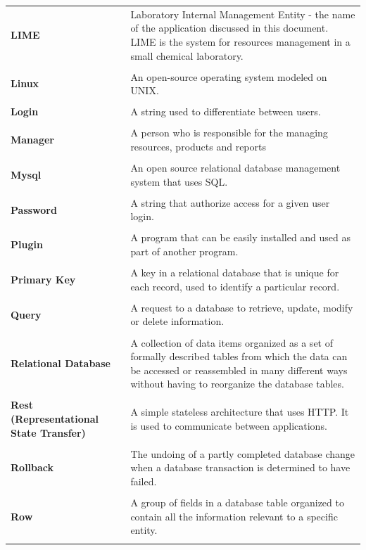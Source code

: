 \documentclass[a4paper,11pt,twoside]{report}
\theoremstyle{definition}
\begin{document}
\begin{longtable}{p{4cm} p{11cm}}
\textbf{LIME} & Laboratory Internal Management Entity - the name of the application discussed in this document. LIME is the system for resources management in a small chemical laboratory. \\ \\

\textbf{Linux} & An open-source operating system modeled on UNIX.\\ \\
\textbf{Login} & A string used to differentiate between users.\\ \\
\textbf{Manager} & A person who is responsible for the managing resources, products and reports\\ \\
\textbf{Mysql} & An open source relational database management system that uses SQL.\\ \\
\textbf{Password} & A string that authorize access for a given user login.\\ \\
\textbf{Plugin} & A program that can be easily installed and used as part of another program.\\ \\
\textbf{Primary Key} & A key in a relational database that is unique for each record, used to identify a particular record.\\ \\
\textbf{Query} & A request to a database to retrieve, update, modify or delete information.\\ \\
\textbf{Relational Database} & A collection of data items organized as a set of formally described tables from which the data can be accessed or reassembled in many different ways without having to reorganize the database tables.\\ \\
\textbf{Rest (\mbox{Representational} \mbox{State} \mbox{Transfer})} & A simple stateless architecture that uses HTTP. It is used to communicate between applications.\\ \\
\textbf{Rollback} & The undoing of a partly completed database change when a database transaction is determined to have failed.\\ \\
\textbf{Row} & A group of fields in a database table organized to contain all the information relevant to a specific entity.\\ \\

\end{longtable}
\end{document}
